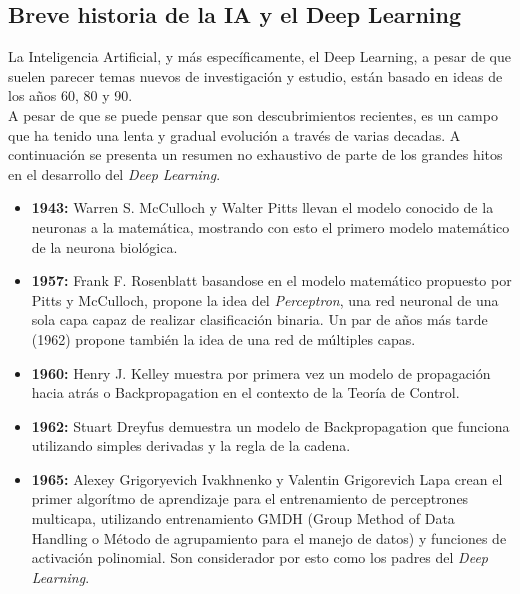 \clearpage
\subsection{Breve historia de la IA y el Deep Learning}
La Inteligencia Artificial, y más específicamente, el Deep Learning, a
pesar de que suelen parecer temas nuevos de investigación y estudio, están basado en ideas
de los años 60, 80 y 90.\\
A pesar de que se puede pensar que son descubrimientos recientes, es un campo
que ha tenido una lenta y gradual evolución a través de varias decadas. A continuación se presenta
un resumen no exhaustivo de parte de los grandes hitos en el desarrollo del \emph{Deep Learning}.



\begin{itemize}
    \item \textbf{1943:} Warren S. McCulloch y Walter Pitts llevan el modelo conocido de la neuronas
            a la matemática, mostrando con esto el primero modelo matemático de la neurona biológica. \cite{mccullochLogicalCalculusIdeas1943} \\

    \item \textbf{1957:} Frank F. Rosenblatt basandose en el modelo matemático propuesto por Pitts y McCulloch,
            propone la idea del \emph{Perceptron}, una red neuronal de una sola capa capaz de
            realizar clasificación binaria. Un par de años más tarde (1962) propone también la idea
            de una red de múltiples capas. \cite{rosenblattPerceptronProbabilisticModel1958} \\

    \item \textbf{1960:} Henry J. Kelley muestra por primera vez un modelo de propagación hacia atrás o
    Backpropagation en el contexto de la Teoría de Control. \cite{kelleyGradientTheoryOptimal1960} \\

    \item \textbf{1962:} Stuart Dreyfus demuestra un modelo de Backpropagation que funciona utilizando
        simples derivadas y la regla de la cadena. \cite{dreyfusNumericalSolutionVariational1962} \\


    \item \textbf{1965:} Alexey Grigoryevich Ivakhnenko y Valentin Grigorevich Lapa crean el
    primer algorítmo de aprendizaje para el entrenamiento de perceptrones multicapa, utilizando entrenamiento
    GMDH (Group Method of Data Handling o Método de agrupamiento para el manejo de datos) y funciones
    de activación polinomial. Son considerador por esto como los padres del \emph{Deep Learning}. \cite{ivakhnenkoCyberneticPredictingDevices1966} \\


\end{itemize}
